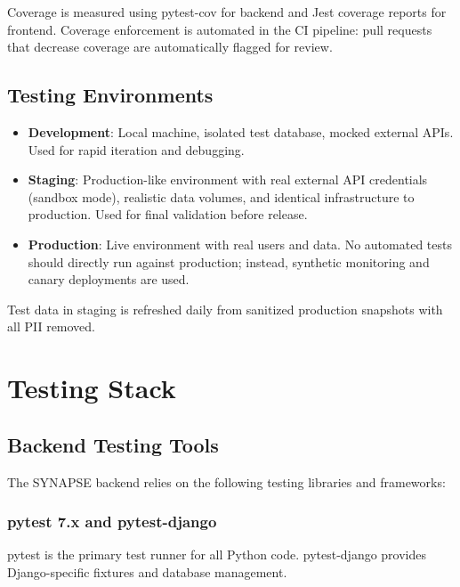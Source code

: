 \documentclass{report}
\begin{document}
Coverage is measured using pytest-cov for backend and Jest coverage reports for frontend. Coverage enforcement is automated in the CI pipeline: pull requests that decrease coverage are automatically flagged for review.

\section{Testing Environments}

\begin{itemize}
  \item \textbf{Development}: Local machine, isolated test database, mocked external APIs. Used for rapid iteration and debugging.
  \item \textbf{Staging}: Production-like environment with real external API credentials (sandbox mode), realistic data volumes, and identical infrastructure to production. Used for final validation before release.
  \item \textbf{Production}: Live environment with real users and data. No automated tests should directly run against production; instead, synthetic monitoring and canary deployments are used.
\end{itemize}

Test data in staging is refreshed daily from sanitized production snapshots with all PII removed.

\chapter{Testing Stack}

\section{Backend Testing Tools}

The SYNAPSE backend relies on the following testing libraries and frameworks:

\subsection{pytest 7.x and pytest-django}

pytest is the primary test runner for all Python code. pytest-django provides Django-specific fixtures and database management.
\end{document}
